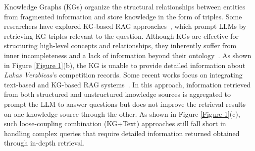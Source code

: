 \documentclass{article} %
\begin{document}
Knowledge Graphs (KGs) organize the structural relationships between entities from fragmented information and store knowledge in the form of triples. Some researchers have explored KG-based RAG approaches~\citep{sun2024thinkongraphdeepresponsiblereasoning}, which prompt LLMs by retrieving KG triples relevant to the question.
Although KGs are effective for structuring high-level concepts and relationships, they inherently suffer from inner incompleteness and a lack of information beyond their ontology~\cite{li-etal-2024-integration,li2024retrievalreasoningrerankingcontextenriched}. As shown in Figure \ref{Figure 1}(b), the KG is unable to provide detailed information about \textit{Lukas Verzbicas}'s competition records. 
Some recent works focus on integrating text-based and KG-based RAG systems~\citep{li2024cok,edge2024localglobalgraphrag}. In this approach, information retrieved from both structured and unstructured knowledge sources is aggregated to prompt the LLM to answer questions but does not improve the retrieval results on one knowledge source through the other. As shown in Figure \ref{Figure 1}(c), such loose-coupling combination (KG+Text) approaches still fall short in handling complex queries that require detailed information returned obtained through in-depth retrieval.

\end{document}
